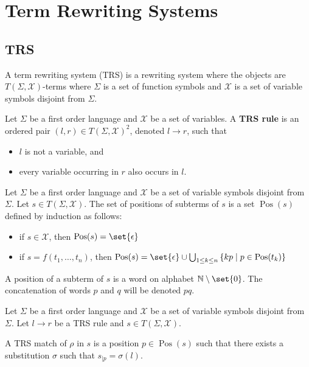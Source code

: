 \section{Term Rewriting Systems}

\subsection{TRS}
A term rewriting system (TRS) is a rewriting system where the objects are $T(\Sigma,\mathcal{X})$-terms where $\Sigma$ is a set of function symbols and $\mathcal{X}$ is a set of variable symbols disjoint from $\Sigma$.
  
\begin{definition}
    Let $\Sigma$ be a first order language and $\mathcal{X}$ be a set of variables. A \textbf{TRS rule} is an ordered pair $(l,r) \in T(\Sigma, \mathcal{X})^2$, denoted $l \to r$, such that
    \begin{itemize}
      \item $l$ is not a variable, and
      \item every variable occurring in $r$ also occurs in $l$.
    \end{itemize}
  \end{definition}
  
  \begin{definition}
    Let $\Sigma$ be a first order language and $\mathcal{X}$ be a set of variable symbols disjoint from $\Sigma$. Let $s \in T(\Sigma, \mathcal{X})$.
    The set of positions of subterms of $s$ is a set $\operatorname{Pos}(s)$ defined by induction as follows:
    \begin{itemize}
      \item if $s \in \mathcal{X}$, then $\operatorname{Pos}(s) = \set{\epsilon}$
      \item if $s = f(t_1,\hdots,t_n)$, 
            then $\operatorname{Pos}(s) = \set{\epsilon} \cup \bigcup_{1 \leq k \leq n} \left \{kp\mid p \in \operatorname{Pos}(t_k) \right \}$
  \end{itemize}
  A position of a subterm of $s$ is a word on alphabet $\mathbb{N}\setminus\set{0}$. 
    The concatenation of words $p$ and $q$ will be denoted $pq$.
  \end{definition}
  
  \begin{definition}[Match]
    \label{def:trs:match}
    Let $\Sigma$ be a first order language and $\mathcal{X}$ be a set of variable symbols disjoint from $\Sigma$. Let $ l \to r $ be a TRS rule and $s \in T(\Sigma, \mathcal{X})$.

    A TRS match of $\rho$ in $s$ is a position $p \in \operatorname{Pos}(s)$ such that there exists a substitution $\sigma$ such that $s_{|p} = \sigma(l)$.
  \end{definition}

